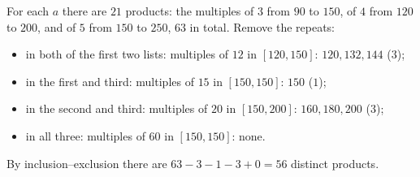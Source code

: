 For each $a$ there are $21$ products: the multiples of $3$ from $90$ to $150$, of $4$ from $120$ to $200$, and of $5$ from $150$ to $250$, $63$ in total. Remove the repeats:
\begin{itemize}
\item in both of the first two lists: multiples of $12$ in $[120,150]$: $120,132,144$ ($3$);
\item in the first and third: multiples of $15$ in $[150,150]$: $150$ ($1$);
\item in the second and third: multiples of $20$ in $[150,200]$: $160,180,200$ ($3$);
\item in all three: multiples of $60$ in $[150,150]$: none.
\end{itemize}
By inclusion--exclusion there are $63-3-1-3+0=\boxed{56}$ distinct products.
